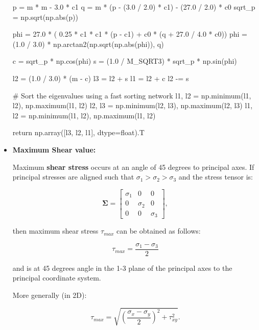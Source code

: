 \begin{itemize}
\begin{python}
    p = m * m - 3.0 * c1
    q = m * (p - (3.0 / 2.0) * c1) - (27.0 / 2.0) * c0
    sqrt_p = np.sqrt(np.abs(p))

    phi = 27.0 * ( 0.25 * c1 * c1 * (p - c1) + c0 * (q + 27.0 / 4.0 * c0))
    phi = (1.0 / 3.0) * np.arctan2(np.sqrt(np.abs(phi)), q)

    c = sqrt_p * np.cos(phi)
    s = (1.0 / M_SQRT3) * sqrt_p * np.sin(phi)

    l2 = (1.0 / 3.0) * (m - c)
    l3  = l2 + s
    l1  = l2 + c
    l2 -= s

    # Sort the eigenvalues using a fast sorting network
    l1, l2 = np.minimum(l1, l2), np.maximum(l1, l2)
    l2, l3 = np.minimum(l2, l3), np.maximum(l2, l3)
    l1, l2 = np.minimum(l1, l2), np.maximum(l1, l2)

    return np.array([l3, l2, l1], dtype=float).T

\end{python}



    \item \textbf{Maximum Shear value:}


        Maximum \textbf{shear stress} occurs at an angle of 45 degrees to principal axes.
        If principal stresses are aligned such that $\sigma_1 > \sigma_2 > \sigma_3$
        and the stress tensor is:

        \begin{equation}
            \mathbf{\Sigma} = \begin{bmatrix}
                \sigma_1 & 0 & 0 \\
                0 & \sigma_2 & 0 \\
                0 & 0 & \sigma_3
            \end{bmatrix}
        ,\end{equation}

        then maximum shear stress $\tau_{max}$ can be obtained as follows:

        \begin{equation}
            \tau_{max} = \frac{\sigma_1 - \sigma_3}{2}
        \end{equation}

        and is at 45 degrees angle in the 1-3 plane of the principal axes to the
        principal coordinate system.

        More generally (in 2D):

        \begin{equation}
            \tau_{max} = \sqrt{\left(\frac{\sigma_{x} - \sigma_{y}}{2}\right)^{2}
            + \tau_{xy}^{2}}
        .\end{equation}


\end{itemize}
